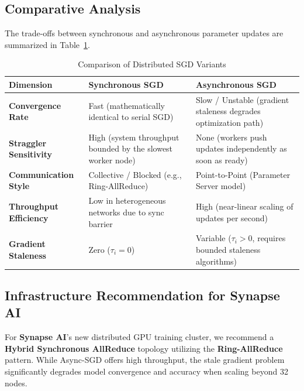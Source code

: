 \subsection{Comparative Analysis}

The trade-offs between synchronous and asynchronous parameter updates are summarized in Table~\ref{tab:sgd_comparison}.

\begin{table}[h]
  \centering
  \caption{Comparison of Distributed SGD Variants}
  \label{tab:sgd_comparison}
  \medskip
  \begin{tabularx}{\textwidth}{p{3.5cm} X X}
    \toprule
    \textbf{Dimension} & \textbf{Synchronous SGD} & \textbf{Asynchronous SGD} \\
    \midrule
    \textbf{Convergence Rate} & Fast (mathematically identical to serial SGD) & Slow / Unstable (gradient staleness degrades optimization path) \\
    \textbf{Straggler Sensitivity} & High (system throughput bounded by the slowest worker node) & None (workers push updates independently as soon as ready) \\
    \textbf{Communication Style} & Collective / Blocked (e.g., Ring-AllReduce) & Point-to-Point (Parameter Server model) \\
    \textbf{Throughput Efficiency} & Low in heterogeneous networks due to sync barrier & High (near-linear scaling of updates per second) \\
    \textbf{Gradient Staleness} & Zero ($\tau_i = 0$) & Variable ($\tau_i > 0$, requires bounded staleness algorithms) \\
    \bottomrule
  \end{tabularx}
\end{table}

\subsection{Infrastructure Recommendation for Synapse AI}

For \textbf{Synapse AI}'s new distributed GPU training cluster, we recommend a \textbf{Hybrid Synchronous AllReduce} topology utilizing the \textbf{Ring-AllReduce} pattern. While Async-SGD offers high throughput, the stale gradient problem significantly degrades model convergence and accuracy when scaling beyond 32 nodes.

